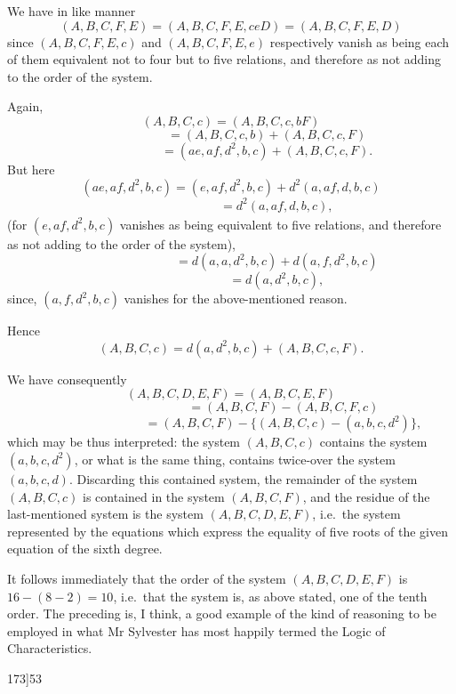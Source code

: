 \documentclass[11pt]{article}
\begin{document}
\medskip

\noindent We have in like manner
\[
(A, B, C, F, E) = (A, B, C, F, E, ceD) = (A, B, C, F, E, D)
\]
since $(A, B, C, F, E, c)$ and $(A, B, C, F, E, e)$ respectively vanish as being each of
them equivalent not to four but to five relations, and therefore as not adding to the
order of the system.

Again,
\[
(A, B, C, c) = (A, B, C, c, bF)
\]
\[
\phantom{(A, B, C, c)} = (A, B, C, c, b) + (A, B, C, c, F)
\]
\[
\phantom{(A, B, C, c)} = (ae, af, d^{2}, b, c) + (A, B, C, c, F).
\]
But here
\[
(ae, af, d^{2}, b, c) = (e, af, d^{2}, b, c) + d^{2}(a, af, d, b, c)
\]
\[
\phantom{(ae, af, d^{2}, b, c)} = d^{2}(a, af, d, b, c),
\]
(for $(e, af, d^{2}, b, c)$ vanishes as being equivalent to five relations, and therefore as not
adding to the order of the system),
\[
\phantom{(ae, af, d^{2}, b, c)} = d(a, a, d^{2}, b, c) + d(a, f, d^{2}, b, c)
\]
\[
\phantom{(ae, af, d^{2}, b, c)} = d(a, d^{2}, b, c),
\]
since, $(a, f, d^{2}, b, c)$ vanishes for the above-mentioned reason.

Hence
\[
(A, B, C, c) = d(a, d^{2}, b, c) + (A, B, C, c, F).
\]

We have consequently
\[
(A, B, C, D, E, F) = (A, B, C, E, F)
\]
\[
\phantom{(A, B, C, D, E, F)} = (A, B, C, F) - (A, B, C, F, c)
\]
\[
\phantom{(A, B, C, D, E, F)} = (A, B, C, F) - \bigl\{(A, B, C, c) - (a, b, c, d^{2})\bigr\},
\]
which may be thus interpreted: the system $(A, B, C, c)$ contains the system $(a, b, c, d^{2})$,
or what is the same thing, contains twice-over the system $(a, b, c, d)$. Discarding
this contained system, the remainder of the system $(A, B, C, c)$ is contained in the
system $(A, B, C, F)$, and the residue of the last-mentioned system is the system
$(A, B, C, D, E, F)$, i.e.\ the system represented by the equations which express the
equality of five roots of the given equation of the sixth degree.

It follows immediately that the order of the system $(A, B, C, D, E, F)$ is
$16 - (8 - 2) = 10$, i.e.\ that the system is, as above stated, one of the tenth order.
The preceding is, I think, a good example of the kind of reasoning to be employed
in what Mr Sylvester has most happily termed the Logic of Characteristics.

\newpage

\begin{center}
\small 173]\hfill\textsc{53}
\end{center}
\end{document}
